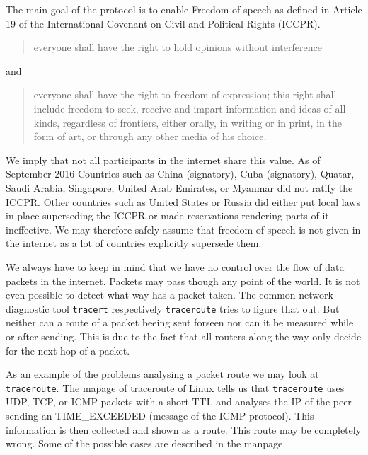The main goal of the protocol is to enable Freedom of speech as defined in Article 19 of the International Covenant on Civil and Political Rights (ICCPR)\cite{iccpr}.
\begin{quote}
	everyone shall have the right to hold opinions without interference 
\end{quote}
and
\begin{quote}
	everyone shall have the right to freedom of expression; this right shall include freedom to seek, receive and impart information and ideas of all kinds, regardless of frontiers, either orally, in writing or in print, in the form of art, or through any other media of his choice.
\end{quote}

We imply that not all participants in the internet share this value. As of September  2016 Countries such as China (signatory), Cuba (signatory), Quatar, Saudi Arabia, Singapore, United Arab Emirates, or Myanmar did not ratify the ICCPR. Other countries such as United States or Russia did either put local laws in place superseding the ICCPR or made reservations rendering parts of it ineffective. We may therefore safely assume that freedom of speech is not given in the internet as a lot of countries explicitly supersede them.

We always have to keep in mind that we have no control over the flow of data packets in the internet. Packets may pass though any point of the world. It is not even possible to detect what way has a packet taken. The common network diagnostic tool \verb|tracert| respectively \verb|traceroute| tries to figure that out. But neither can a route of a packet beeing sent forseen nor can it be measured while or after sending. This is due to the fact that all routers along the way only decide for the next hop of a packet.

As an example of the problems analysing a packet route we may look at \verb|traceroute|. The mapage of traceroute of Linux tells us that \verb|traceroute| uses UDP, TCP, or ICMP packets with a short TTL and analyses the IP of the peer sending an TIME\_EXCEEDED (message of the ICMP protocol). This information is then collected and shown as a route. This route may be completely wrong. Some of the possible cases are described in the manpage.

